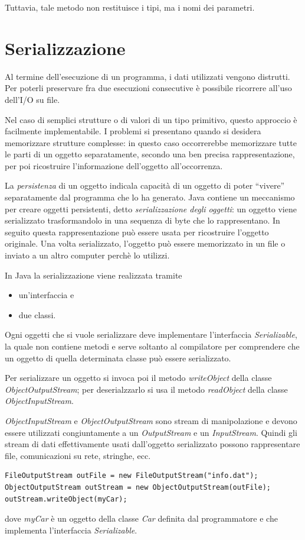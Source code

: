 \documentclass[12pt]{report}
\begin{document}
Tuttavia, tale metodo non restituisce i tipi, ma i nomi dei parametri.
\section{Serializzazione}
Al termine dell'esecuzione di un programma, i dati utilizzati vengono distrutti. Per poterli preservare fra due esecuzioni consecutive è possibile ricorrere all'uso dell'I/O su file.

Nel caso di semplici strutture o di valori di un tipo primitivo, questo approccio è facilmente implementabile. I problemi si presentano quando si desidera memorizzare strutture complesse: in questo caso occorrerebbe memorizzare tutte le parti di un oggetto separatamente, secondo una ben precisa rappresentazione, per poi ricostruire l'informazione dell'oggetto all'occorrenza.

La \textit{persistenza} di un oggetto indicala capacità di un oggetto di poter ``vivere'' separatamente dal programma che lo ha generato. Java contiene un meccanismo per creare oggetti persistenti, detto \textit{serializzazione degli oggetti}: un oggetto viene serializzato trasformandolo in una sequenza di byte che lo rappresentano. In seguito questa rappresentazione può essere usata per ricostruire l'oggetto originale. Una volta serializzato, l'oggetto può essere memorizzato in un file o inviato a un altro computer perchè lo utilizzi.

In Java la serializzazione viene realizzata tramite
\begin{itemize}
	\item un'interfaccia e
	\item due classi.
\end{itemize}
Ogni oggetti che si vuole serializzare deve implementare l'interfaccia \textit{Serializable}, la quale non contiene metodi e serve soltanto al compilatore per comprendere che un oggetto di quella determinata classe può essere serializzato.

Per serializzare un oggetto si invoca poi il metodo \textit{writeObject} della classe \textit{ObjectOutputStream}; per deserialzzarlo si usa il metodo \textit{readObject} della classe \textit{ObjectInputStream}.

\textit{ObjectInputStream} e \textit{ObjectOutputStream} sono stream di manipolazione e devono essere utilizzati congiuntamente a un \textit{OutputStream} e un \textit{InputStream}. Quindi gli stream di dati effettivamente usati dall'oggetto serializzato possono rappresentare file, comunicazioni su rete, stringhe, ecc.
\begin{lstlisting}[style=javastyle]
FileOutputStream outFile = new FileOutputStream("info.dat");
ObjectOutputStream outStream = new ObjectOutputStream(outFile);
outStream.writeObject(myCar);
\end{lstlisting}
dove \textit{myCar} è un oggetto della classe \textit{Car} definita dal programmatore e che implementa l'interfaccia \textit{Serializable}.
\end{document}
